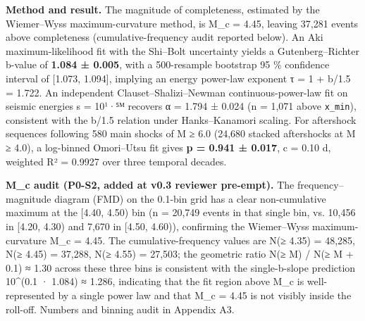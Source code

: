 \documentclass[
  11pt]{article}
\begin{document}
\textbf{Method and result.} The magnitude of completeness, estimated by
the Wiemer--Wyss maximum-curvature method, is M\_c = 4.45, leaving
37,281 events above completeness (cumulative-frequency audit reported
below). An Aki maximum-likelihood fit with the Shi--Bolt uncertainty
yields a Gutenberg--Richter b-value of \textbf{1.084 ± 0.005}, with a
500-resample bootstrap 95 \% confidence interval of {[}1.073, 1.094{]},
implying an energy power-law exponent τ = 1 + b/1.5 = 1.722. An
independent Clauset--Shalizi--Newman continuous-power-law fit on seismic
energies s = 10¹·⁵ᴹ recovers α = 1.794 ± 0.024 (n = 1,071 above
\texttt{x\_min}), consistent with the b/1.5 relation under
Hanks--Kanamori scaling. For aftershock sequences following 580 main
shocks of M ≥ 6.0 (24,680 stacked aftershocks at M ≥ 4.0), a log-binned
Omori--Utsu fit gives \textbf{p = 0.941 ± 0.017}, c = 0.10 d, weighted
R² = 0.9927 over three temporal decades.

\textbf{M\_c audit (P0-S2, added at v0.3 reviewer pre-empt).} The
frequency--magnitude diagram (FMD) on the 0.1-bin grid has a clear
non-cumulative maximum at the {[}4.40, 4.50) bin (n = 20,749 events in
that single bin, vs. 10,456 in {[}4.20, 4.30) and 7,670 in {[}4.50,
4.60)), confirming the Wiemer--Wyss maximum-curvature M\_c = 4.45. The
cumulative-frequency values are N(≥ 4.35) = 48,285, N(≥ 4.45) = 37,288,
N(≥ 4.55) = 27,503; the geometric ratio N(≥ M) / N(≥ M + 0.1) ≈ 1.30
across these three bins is consistent with the single-b-slope prediction
10\^{}(0.1 · 1.084) ≈ 1.286, indicating that the fit region above M\_c
is well-represented by a single power law and that M\_c = 4.45 is not
visibly inside the roll-off. Numbers and binning audit in Appendix A3.
\end{document}
